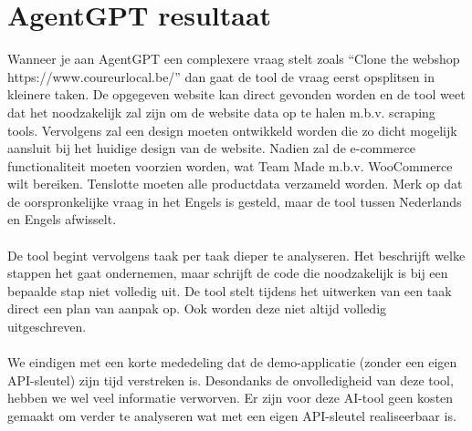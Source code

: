 \documentclass[dutch,dit,thesis]{hogentreport}
\begin{document}
\chapter{AgentGPT resultaat}
Wanneer je aan AgentGPT een complexere vraag stelt zoals “Clone the webshop https://www.coureurlocal.be/” dan gaat de tool de vraag eerst opsplitsen in kleinere taken. De opgegeven website kan direct gevonden worden en de tool weet dat het noodzakelijk zal zijn om de website data op te halen m.b.v. scraping tools. Vervolgens zal een design moeten ontwikkeld worden die zo dicht mogelijk aansluit bij het huidige design van de website. Nadien zal de e-commerce functionaliteit moeten voorzien worden, wat Team Made m.b.v. WooCommerce wilt bereiken. Tenslotte moeten alle productdata verzameld worden. Merk op dat de oorspronkelijke vraag in het Engels is gesteld, maar de tool tussen Nederlands en Engels afwisselt.
\\\\
De tool begint vervolgens taak per taak dieper te analyseren. Het beschrijft welke stappen het gaat ondernemen, maar schrijft de code die noodzakelijk is bij een bepaalde stap niet volledig uit. De tool stelt tijdens het uitwerken van een taak direct een plan van aanpak op. Ook worden deze niet altijd volledig uitgeschreven. 
\\\\
We eindigen met een korte mededeling dat de demo-applicatie (zonder een eigen API-sleutel) zijn tijd verstreken is. Desondanks de onvolledigheid van deze tool, hebben we wel veel informatie verworven. Er zijn voor deze AI-tool geen kosten gemaakt om verder te analyseren wat met een eigen API-sleutel realiseerbaar is.

%


\backmatter{}

\setlength\bibitemsep{2pt} %
\printbibliography[heading=bibintoc]
\end{document}

